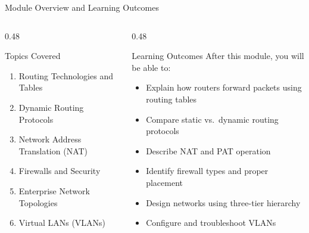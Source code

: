 \documentclass[aspectratio=169]{beamer}  %
\begin{document}
\begin{frame}[t,shrink=10]{Module Overview and Learning Outcomes}
    \begin{columns}[T]
        \begin{column}{0.48\textwidth}
            \begin{block}{Topics Covered}
                \begin{enumerate}
                    \item Routing Technologies and Tables
                    \item Dynamic Routing Protocols
                    \item Network Address Translation (NAT)
                    \item Firewalls and Security
                    \item Enterprise Network Topologies
                    \item Virtual LANs (VLANs)
                \end{enumerate}
            \end{block}
        \end{column}
        \begin{column}{0.48\textwidth}
            \begin{block}{Learning Outcomes}
                After this module, you will be able to:
                \begin{itemize}
                    \item Explain how routers forward packets using routing tables
                    \item Compare static vs.\ dynamic routing protocols
                    \item Describe NAT and PAT operation
                    \item Identify firewall types and proper placement
                    \item Design networks using three-tier hierarchy
                    \item Configure and troubleshoot VLANs
                \end{itemize}
            \end{block}
        \end{column}
    \end{columns}
\end{frame}



\end{document}
